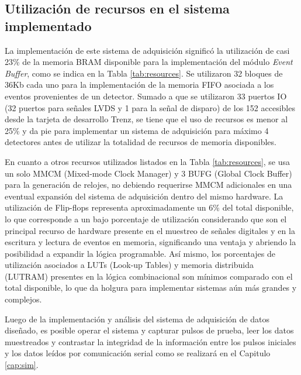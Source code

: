 	
	\subsection{Utilización de recursos en el sistema implementado}
	
	La implementación de este sistema de adquisición significó la utilización de casi 23\% de la memoria BRAM disponible para la implementación del módulo \textit{Event Buffer}, como se indica en la Tabla \ref{tab:resources}. Se utilizaron 32 bloques de 36Kb cada uno para la implementación de la memoria FIFO asociada a los eventos provenientes de un detector. Sumado a que se utilizaron 33 puertos IO (32 puertos para señales LVDS y 1 para la señal de disparo) de los 152 accesibles desde la tarjeta de desarrollo Trenz, se tiene que el uso de recursos es menor al 25\% y da pie para implementar un sistema de adquisición para máximo 4 detectores antes de utilizar la totalidad de recursos de memoria disponibles.
	
	En cuanto a otros recursos utilizados listados en la Tabla \ref{tab:resources}, se usa un solo MMCM (Mixed-mode Clock Manager) y 3 BUFG (Global Clock Buffer) para la generación de relojes, no debiendo requerirse MMCM adicionales en una eventual expansión del sistema de adquisición dentro del mismo hardware. La utilización de Flip-flops representa aproximadamente un 6\% del total disponible, lo que corresponde a un bajo porcentaje de utilización considerando que son el principal recurso de hardware presente en el muestreo de señales digitales y en la escritura y lectura de eventos en memoria, significando una ventaja y abriendo la posibilidad a expandir la lógica programable. Así mismo, los porcentajes de utilización asociados a LUTs (Look-up Tables) y memoria distribuida (LUTRAM) presentes en la lógica combinacional son mínimos comparado con el total disponible, lo que da holgura para implementar sistemas aún más grandes y complejos.
	
	Luego de la implementación y análisis del sistema de adquisición de datos diseñado, es posible operar el sistema y capturar pulsos de prueba, leer los datos muestreados y contrastar la integridad de la información entre los pulsos iniciales y los datos leídos por comunicación serial como se realizará en el Capitulo \ref{cap:sim}.
	
